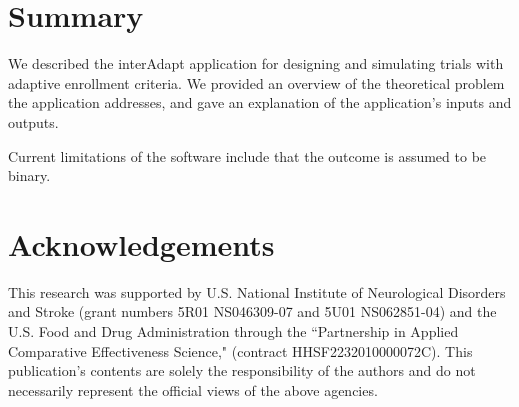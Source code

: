 \documentclass{article}
\newcommand{\interAdapt}{\textsf{interAdapt }}
\begin{document}
\section*{Summary}

We described the \interAdapt application for designing and simulating trials with adaptive enrollment criteria. We provided an overview of the theoretical problem the application addresses, and gave an explanation of the application’s inputs and outputs.

Current limitations of the software include that the outcome is assumed to be binary.



\section*{Acknowledgements}
This research was supported by U.S. National Institute of Neurological Disorders and Stroke (grant numbers 5R01 NS046309-07 and 5U01 NS062851-04) and
the U.S.  Food and Drug Administration through the ``Partnership in Applied Comparative Effectiveness Science," (contract HHSF2232010000072C).
This publication's contents are solely the responsibility of the authors and do not necessarily represent the official views of the above agencies.





\end{document}
